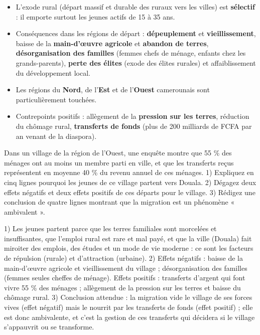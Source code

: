 \documentclass[11pt]{article}
\newcommand{\cle}[1]{{\popxbold\color{popdark}#1}}
\begin{document}
\begin{aretenir}
\begin{itemize}
\item L'\cle{exode rural} (départ massif et durable des ruraux vers les villes) est \textbf{sélectif} : il emporte surtout les jeunes actifs de 15 à 35 ans.
\item Conséquences dans les régions de départ : \textbf{dépeuplement} et \textbf{vieillissement}, baisse de la \textbf{main-d'œuvre agricole} et \textbf{abandon de terres}, \textbf{désorganisation des familles} (femmes chefs de ménage, enfants chez les grands-parents), \textbf{perte des élites} (exode des élites rurales) et affaiblissement du développement local.
\item Les régions du \textbf{Nord}, de l'\textbf{Est} et de l'\textbf{Ouest} camerounais sont particulièrement touchées.
\item Contrepoints positifs : allègement de la \textbf{pression sur les terres}, réduction du chômage rural, \textbf{transferts de fonds} (plus de 200 milliards de FCFA par an venant de la diaspora).
\end{itemize}
\end{aretenir}

\begin{exercice}
Dans un village de la région de l'Ouest, une enquête montre que 55 \% des ménages ont au moins un membre parti en ville, et que les transferts reçus représentent en moyenne 40 \% du revenu annuel de ces ménages.
1) Expliquez en cinq lignes pourquoi les jeunes de ce village partent vers Douala.
2) Dégagez deux effets négatifs et deux effets positifs de ces départs pour le village.
3) Rédigez une conclusion de quatre lignes montrant que la migration est un phénomène « ambivalent ».
\end{exercice}

\begin{corrige}[Exercice]
1) Les jeunes partent parce que les terres familiales sont morcelées et insuffisantes, que l'emploi rural est rare et mal payé, et que la ville (Douala) fait miroiter des emplois, des études et un mode de vie moderne : ce sont les facteurs de répulsion (rurale) et d'attraction (urbaine).
2) Effets négatifs : baisse de la main-d'œuvre agricole et vieillissement du village ; désorganisation des familles (femmes seules cheffes de ménage). Effets positifs : transferts d'argent qui font vivre 55 \% des ménages ; allègement de la pression sur les terres et baisse du chômage rural.
3) Conclusion attendue : la migration vide le village de ses forces vives (effet négatif) mais le nourrit par les transferts de fonds (effet positif) ; elle est donc ambivalente, et c'est la gestion de ces transferts qui décidera si le village s'appauvrit ou se transforme.
\end{corrige}
\end{document}
